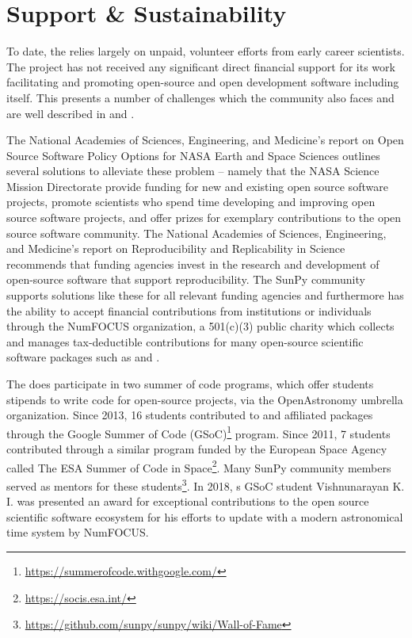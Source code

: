 \section{Support \& Sustainability}
\label{sec:intro:support}

To date, the \sunpyproj relies largely on unpaid, volunteer efforts from early career scientists.
The project has not received any significant direct financial support for its work facilitating and promoting open-source and open development software including \sunpypkg itself.
This presents a number of challenges which the \astropy community also faces and are well described in \cite{PriceWhelan:2018ji} and \cite{Muna2016}.

The National Academies of Sciences, Engineering, and Medicine's report on Open Source Software Policy Options for NASA Earth and Space Sciences \citep{NAP2018} outlines several solutions to alleviate these problem -- namely that the NASA Science Mission Directorate provide funding for new and existing open source software projects, promote scientists who spend time developing and improving open source software projects, and offer prizes for exemplary contributions to the open source software community.
The National Academies of Sciences, Engineering, and Medicine's report on Reproducibility and Replicability in Science \citep{NAP2019} recommends that funding agencies invest in the research and development of open-source software that support reproducibility.
The SunPy community supports solutions like these for all relevant funding agencies and furthermore has the ability to accept financial contributions from institutions or individuals through the NumFOCUS organization, a 501(c)(3) public charity which collects and manages tax-deductible contributions for many open-source scientific software packages such as \numpy and \astropy.

The \sunpyproj does participate in two summer of code programs, which offer students stipends to write code for open-source projects, via the OpenAstronomy umbrella organization.
Since 2013, 16 students contributed to \sunpypkg and affiliated packages through the Google Summer of Code (GSoC)\footnote{\url{https://summerofcode.withgoogle.com/}} program.
Since 2011, 7 students contributed through a similar program funded by the European Space Agency called The ESA Summer of Code in Space\footnote{\url{https://socis.esa.int/}}.
Many SunPy community members served as mentors for these students\footnote{\url{https://github.com/sunpy/sunpy/wiki/Wall-of-Fame}}.
In 2018, s GSoC student Vishnunarayan K. I. was presented an award for exceptional contributions to the open source scientific software ecosystem for his efforts to update \sunpypkg with a modern astronomical time system by NumFOCUS.

